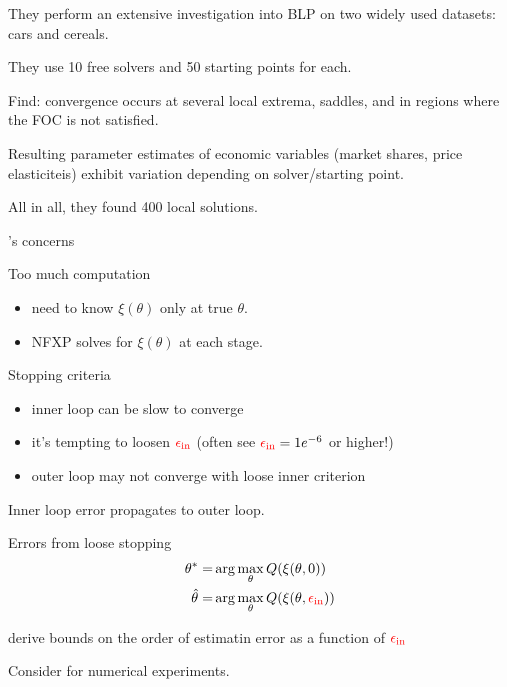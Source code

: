 \documentclass[english]{beamer}
\begin{document}
\begin{frame}{\cite{knittel2014estimation}}

\begin{midi}
\item They perform an extensive investigation into BLP on two widely used datasets: cars and cereals.
\item They use 10 free solvers and 50 starting points for each.
\item Find: convergence occurs at several local extrema, saddles, and in regions where the FOC is not satisfied.
\item Resulting parameter estimates of economic variables (market shares, price elasticiteis) exhibit  variation depending on solver/starting point.
\item All in all, they found 400 local solutions.
\end{midi}
\end{frame}

\begin{frame}{\cite{dube2012improving}'s concerns}
\begin{mide}
\item Too much computation
\begin{itemize}
\item need to know $\xi(\theta)$ only at true $\theta$.
\item NFXP solves for $\xi(\theta)$ at each stage.
\end{itemize}
\item Stopping criteria
\begin{itemize}
\item inner loop can be slow to converge
\item it's tempting to loosen ${\color{red}{\epsilon_\text{in}}}$ (often see ${\color{red}{\epsilon_\text{in}}}=1e^{-6}$ or higher!)
\item outer loop may not converge with loose inner criterion
\end{itemize}
\item Inner loop error propagates to outer loop.
\end{mide}
\end{frame}

\begin{frame}{Errors from loose stopping}
\begin{align*}	
\theta^* = & \arg \max_{\theta} Q(\xi(\theta,0)) \\
\hat{\theta} = & \arg \max_{\theta} Q(\xi(\theta,{\color{red}{\epsilon_\text{in}}})) 
\end{align*}	
\begin{midi}
\item \cite{dube2012improving} derive bounds on the order of estimatin error as a function of ${\color{red}{\epsilon_\text{in}}}$
\item Consider \cite{knittel2014estimation} for numerical experiments.
\end{midi}
\end{frame}
\end{document}
